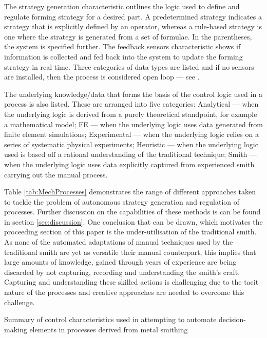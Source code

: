 The strategy generation characteristic outlines the logic used to define and regulate forming strategy for a desired part. A predetermined strategy indicates a strategy that is explicitly defined by an operator, whereas a rule-based strategy is one where the strategy is generated from a set of formulae. In the parentheses, the system is specified further.   The feedback sensors characteristic shows if information is collected and fed back into the system to update the forming strategy in real time. Three categories of data types are listed and if no sensors are installed, then the process is considered open loop --- see \cite{Polyblank2014Closed-loopProspectus}.      

The underlying knowledge/data that forms the basis of the control logic used in a process is also listed. These are arranged into five categories: Analytical --- when the underlying logic is derived from a purely theoretical standpoint, for example a mathematical model; FE --- when the underlying logic uses data generated from finite element simulations; Experimental --- when the underlying logic relies on a series of systematic physical experiments; Heuristic --- when the underlying logic used is based off a rational understanding of the traditional technique;  Smith --- when the underlying logic uses data explicitly captured from experienced smith carrying out the manual process.

Table \ref{tab:MechProcesses} demonstrates the range of different approaches taken to tackle the problem of autonomous strategy generation and regulation of processes. Further discussion on the capabilities of these methods is can be found in section \ref{sec:discussion}. One conclusion that can be drawn, which motivates the proceeding section of this paper is the under-utilisation  of the traditional smith. As none of the automated adaptations of manual techniques used by the traditional smith are yet as versatile their manual counterpart, this implies that large amounts of knowledge, gained through years of experience are being discarded by not capturing, recording and understanding the smith’s craft. Capturing and understanding these skilled actions is challenging due to the tacit nature of the processes and creative approaches are needed to overcome this challenge.

\renewcommand{\arraystretch}{1.2} 
\begin{table}[h] 
    \centering
    \resizebox{\linewidth}{!}{
        
        }
    \caption{Summary of control characteristics used in attempting to automate decision-making elements  in processes derived from metal smithing}
    \label{tab:MechProcesses}
\end{table}

